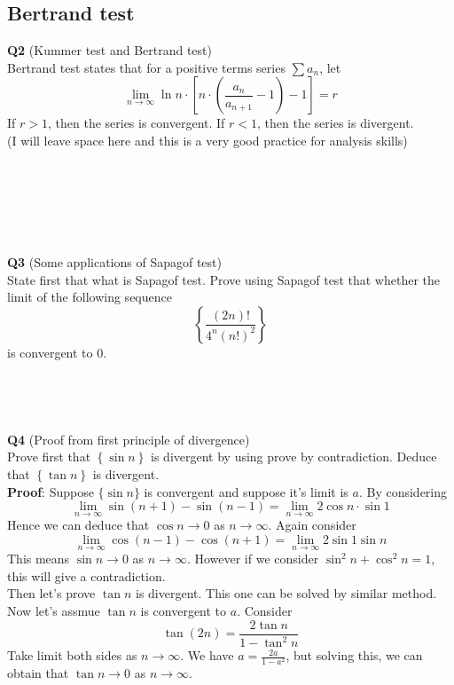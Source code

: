 \documentclass{article}
\begin{document}
\subsection{Bertrand test}
\textbf{Q2} (Kummer test and Bertrand test)\\
Bertrand test states that for a positive terms series $\sum a_n$, let 
$$
\lim_{n \to \infty} \ln n \cdot \left[n\cdot \left(\frac{a_n}{a_{n+1}}-1\right)-1\right] = r
$$
If $r >1$, then the series is convergent. If $r < 1 $, then the series is divergent.\\
(I will leave space here and this is a very good practice for analysis skills)\\
\\
\\
\\
\\
\\
\\
\textbf{Q3} (Some applications of Sapagof test)\\
State first that what is Sapagof test. Prove using Sapagof test that whether the limit of the following sequence
$$
\left\{ \frac{(2n)!}{4^n (n!)^2} \right\}
$$
is convergent to $0$.\\
\\
\\
\\
\\
\textbf{Q4} (Proof from first principle of divergence)\\
Prove first that $\left \{ \sin n\right \}$ is divergent by using prove by contradiction. Deduce that $\left \{ \tan n\right \}$
is divergent.\\
\textbf{Proof}: Suppose $\{\sin n\}$ is convergent and suppose it's limit is $a$. By considering
$$
\lim_{n \to \infty} \sin(n+1) -\sin (n-1) = \lim_{n \to \infty} 2\cos n \cdot \sin 1
$$
Hence we can deduce that $\cos n \rightarrow 0$ as $n \rightarrow \infty$. Again consider
$$
\lim_{n \to \infty} \cos(n-1) - \cos(n+1) = \lim_{n \to \infty} 2 \sin 1 \sin n 
$$
This means $\sin n \rightarrow 0$ as $n \rightarrow \infty$. However if we consider $\sin^2 n + \cos ^ 2 n = 1$, this will give a contradiction.\\
Then let's prove $\tan n$ is divergent. This one can be solved by similar method. Now let's assmue $\tan n$ is convergent to $a$.
Consider 
$$
\tan(2n) = \frac{2\tan n}{1 - \tan^2 n}
$$ 
Take limit both sides as $n\rightarrow \infty$. We have $a = \frac{2a}{1-a^2}$, but solving this, we can obtain that $\tan n \rightarrow 0$ as $n \rightarrow \infty$.
\end{document}
